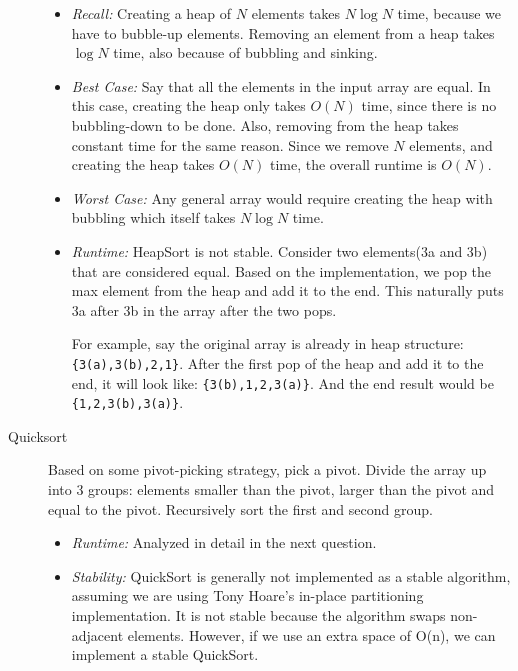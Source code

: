 \begin{solution}
\begin{description}
\begin{itemize}
\item \textit{Recall:} Creating a heap of $N$ elements takes $N \log N$ time,
because we have to bubble-up elements. Removing an element from a heap takes
$\log N$ time, also because of bubbling and sinking.
\item \textit{Best Case:} Say that all the elements in the input array are
equal. In this case, creating the heap only takes $O(N)$ time, since there is
no bubbling-down to be done. Also, removing from the heap takes constant time
for the same reason. Since we remove $N$ elements, and creating the heap takes
$O(N)$ time, the overall runtime is $O(N)$.
\item \textit{Worst Case:} Any general array would require creating the heap
with bubbling which itself takes $N \log N$ time.
\item \textit{Runtime:} HeapSort is not stable. Consider two elements(3a and 3b) that are considered equal. Based on the implementation, we pop the max element from the heap and add it to the end. This naturally puts 3a after 3b in the array after the two pops. 

For example, say the original array is already in heap structure:  
\lstinline${3(a),3(b),2,1}$. After the first pop of the heap and add it to the end, it will look like: \lstinline${3(b),1,2,3(a)}$. And the end result would be \lstinline${1,2,3(b),3(a)}$.
\end{itemize}


\item[Quicksort]
Based on some pivot-picking strategy, pick a pivot.  Divide the array up into 3
groups: elements smaller than the pivot, larger than the pivot and equal to the
pivot. Recursively sort the first and second group.

\begin{itemize}
\item \textit{Runtime:} Analyzed in detail in the next question.
\item \textit{Stability:} QuickSort is generally not implemented as a stable algorithm, assuming we are using Tony Hoare’s in-place partitioning implementation. It is not stable because the algorithm swaps non-adjacent elements.  However, if we use an extra space of O(n), we can implement a stable QuickSort.
\end{itemize}
\end{description}
\end{solution}
